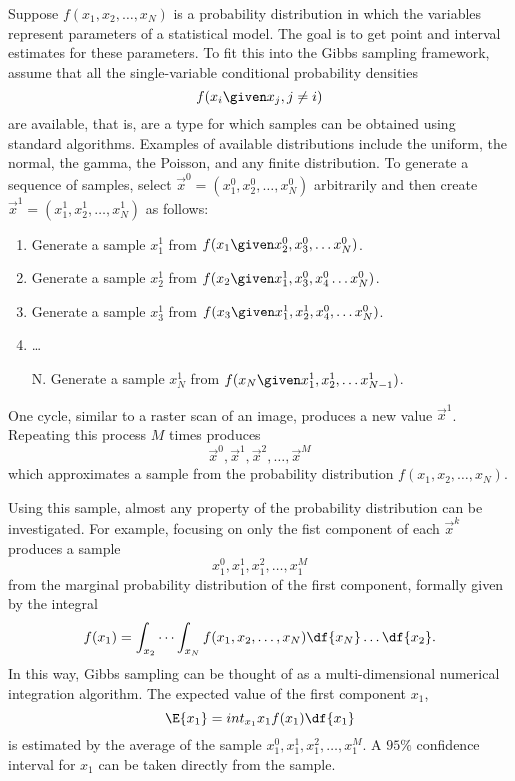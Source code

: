 \documentclass[12pt]{article}
\begin{document}
Suppose \( f(x_1, x_2, \dots, x_N) \) is a probability distribution in
which the variables represent parameters of a statistical model.  The
goal is to get point and interval estimates for these parameters. To fit
this into the Gibbs sampling framework, assume that all the
single-variable conditional probability densities
\[
    f(x_i \given x_j, j \ne i)
\] are available, that is, are a type for which samples can be obtained
using standard algorithms.  Examples of available distributions include
the uniform, the normal, the gamma, the Poisson, and any finite
distribution.  To generate a sequence of samples, select \(
\overrightarrow{x}^0 = (x_1^0, x_2^0, \dots, x_N^0) \) arbitrarily and
then create \( \overrightarrow{x}^1 = (x_1^1, x_2^1, \dots, x_N^1) \) as
follows:
\begin{enumerate}
    \item
        Generate a sample \( x_1^1 \) from \( f(x_1 \given x_2^0, x_3^0,
        \dots x_N^0) \).
    \item
        Generate a sample \( x_2^1 \) from \( f(x_2 \given x_1^1, x_3^0,x_4^
        {0} \dots x_N^0) \).
    \item
        Generate a sample \( x_3^1 \) from \( f(x_3 \given x_1^1, x_2^1,
        x_4^0, \dots x_N^0) \).
    \item
        \dots
    \item[N.]
        Generate a sample \( x_N^1 \) from \( f(x_N \given x_1^1, x_2^1,
        \dots x_{N-1}^1) \).
\end{enumerate}
One cycle, similar to a raster scan of an image, produces a new value \(
\overrightarrow{x}^1 \).  Repeating this process \( M \) times produces
\[
    \overrightarrow{x}^0, \overrightarrow{x}^1, \overrightarrow{x}^2,
    \dots, \overrightarrow{x}^M
\] which approximates a sample from the probability distribution \(
f(x_1, x_2, \dots, x_N) \).

Using this sample, almost any property of the probability distribution
can be investigated.  For example, focusing on only the fist component
of each \( \overrightarrow{x}^k \) produces a sample
\[
    x_1^0, x_1^1, x_1^2,\dots, x_1^M
\] from the marginal probability distribution of the first component,
formally given by the integral
\[
    f(x_1) = \int_{x_2}\cdots \int_{x_N} f(x_1, x_2, \dots, x_N) \df{x_N}
    \dots \df{x_2}.
\] In this way, Gibbs sampling can be thought of as a multi-dimensional
numerical integration algorithm.  The expected value of the first
component \( x_1 \),
\[
    \E{x_1} = int_{x_1} x_1 f(x_1) \df{x_1}
\] is estimated by the average of the sample \( x_1^0, x_1^1, x_1^2,\dots,
x_1^M \).  A \( 95\% \) confidence interval for \( x_1 \) can be taken
directly from the sample.
\end{document}
